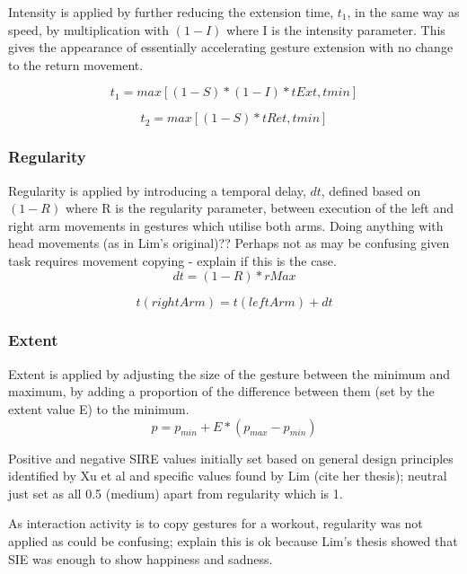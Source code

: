 \documentclass[11pt,a4paper]{report}
\begin{document}
Intensity is applied by further reducing the extension time, $t_{1}$, in the same way as speed, by multiplication with $(1-I)$ where I is the intensity parameter. This gives the appearance of essentially accelerating gesture extension with no change to the return movement. 

\begin{equation}
t_{1} = max[(1-S)*(1-I)*tExt,tmin]
\end{equation}

\begin{equation}
t_{2} = max[(1-S)*tRet,tmin]
\end{equation}

\subsubsection{Regularity}
Regularity is applied by introducing a temporal delay, $dt$, defined based on $(1-R)$ where R is the regularity parameter, between execution of the left and right arm movements in gestures which utilise both arms. Doing anything with head movements (as in Lim's original)?? Perhaps not as may be confusing given task requires movement copying - explain if this is the case.
\begin{equation}
dt = (1-R)*rMax
\end{equation}

\begin{equation}
t(rightArm) = t(leftArm) + dt
\end{equation}

\subsubsection{Extent}
Extent is applied by adjusting the size of the gesture between the minimum and maximum, by adding a proportion of the difference between them (set by the extent value E) to the minimum. 
\begin{equation}
p = p_{min} + E*(p_{max} - p_{min})
\end{equation}

Positive and negative SIRE values initially set based on general design principles identified by Xu et al \cite{xu2013mood} and specific values found by Lim (cite her thesis); neutral just set as all 0.5 (medium) apart from regularity which is 1.

As interaction activity is to copy gestures for a workout, regularity was not applied as could be confusing; explain this is ok because Lim's thesis showed that SIE was enough to show happiness and sadness. 
\end{document}
